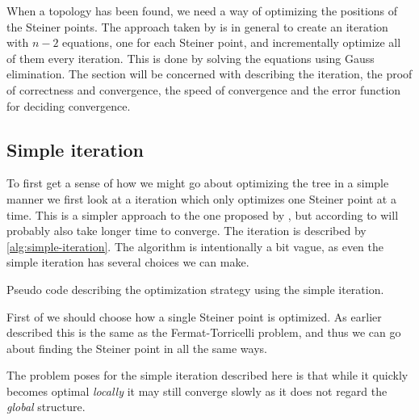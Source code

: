 When a topology has been found, we need a way of optimizing the positions of the
Steiner points. The approach taken by \citeauthor{smith1992} is in general to create an
iteration with $n-2$ equations, one for each Steiner point, and incrementally
optimize all of them every iteration. This is done by solving the equations
using Gauss elimination. The section will be concerned with describing the
iteration, the proof of correctness and convergence, the speed of convergence
and the error function for deciding convergence.

\subsection{Simple iteration}
\label{sec:simple-iteration}

To first get a sense of how we might go about optimizing the tree in a simple
manner we first look at a iteration which only optimizes one Steiner point at a
time. This is a simpler approach to the one proposed by \textcite{smith1992},
but according to \citeauthor{smith1992} will probably also take longer time to
converge. The iteration is described by \cref{alg:simple-iteration}. The
algorithm is intentionally a bit vague, as even the simple iteration has several
choices we can make.

\begin{algorithm}[htbp]
  \caption[Simple iteration]{Pseudo code describing the optimization strategy
    using the simple iteration.\label{alg:simple-iteration}}
\end{algorithm}

First of we should choose how a single Steiner point is optimized. As earlier
described this is the same as the Fermat-Torricelli problem, and thus we can go
about finding the Steiner point in all the same ways.

The problem \citeauthor{smith1992} poses for the simple iteration described here is that while it
quickly becomes optimal \textit{locally} it may still converge slowly as it does not
regard the \textit{global} structure.


